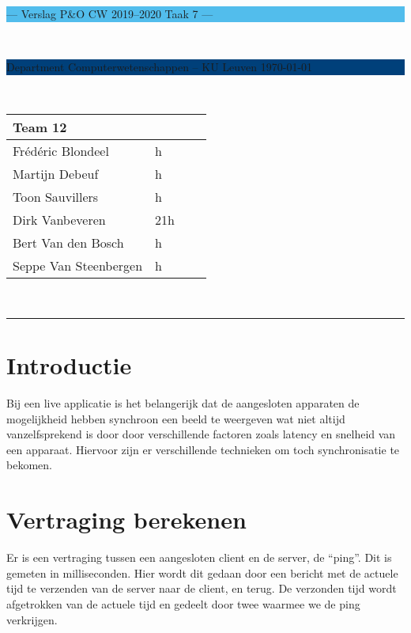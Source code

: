 \documentclass[a4paper,11pt]{article}
\begin{document}
\noindent
\colorbox[HTML]{52BDEC}{\bfseries\parbox{\textwidth}{\centering\large
  --- Verslag P\&O CW 2019--2020 Taak 7 ---
}}
\\[-1mm]
\colorbox[HTML]{00407A}{\bfseries\color{white}\parbox{\textwidth}{
  Department Computerwetenschappen -- KU Leuven
  \hfill
  \today
}}
\\

\smallskip

\noindent

\begin{tabular}{*4l}
\toprule
\multicolumn{2}{l}{\large\textbf{Team 12}} \\
\midrule
Frédéric Blondeel & h \\
Martijn Debeuf & h \\
Toon Sauvillers & h \\ %
Dirk Vanbeveren & 21h \\
Bert Van den Bosch & h \\
Seppe Van Steenbergen & h \\


\bottomrule
\hline
\end{tabular}\\

\noindent
{\color[HTML]{52BDEC} \rule{\linewidth}{1mm} }
\tableofcontents
\newpage
\section{Introductie}\label{sec:introductie}

Bij een live applicatie is het belangerijk dat de aangesloten apparaten de mogelijkheid hebben synchroon een beeld te weergeven wat niet altijd vanzelfsprekend is door door verschillende factoren zoals latency en snelheid van een apparaat. Hiervoor zijn er verschillende technieken om toch synchronisatie te bekomen.

\section{Vertraging berekenen}
Er is een vertraging tussen een aangesloten client en de server, de “ping”. Dit is gemeten in milliseconden.
Hier wordt dit gedaan door een bericht met de actuele tijd te verzenden van de server naar de client, en terug. De verzonden tijd wordt afgetrokken van de actuele tijd en gedeelt door twee waarmee we de ping verkrijgen.
\end{document}
